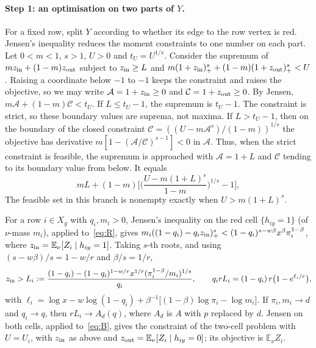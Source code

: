 \documentclass[11pt]{article}
\theoremstyle{definition}
\theoremstyle{remark}
\newcommand{\E}{\mathbb{E}}
\begin{document}
\paragraph{Step 1: an optimisation on two parts of $Y$.} For a fixed row, split $Y$ according to whether its
edge to the row vertex is red. Jensen's inequality reduces the moment constraints to one number on each part.
Let $0<m<1$, $s>1$, $U>0$ and $t_U=U^{1/s}$. Consider the supremum of
$mz_{\rm in}+(1-m)z_{\rm out}$ subject to $z_{\rm in}\ge L$ and $m(1+z_{\rm in})_+^s+(1-m)(1+z_{\rm out})_+^s<U$. Raising
a coordinate below $-1$ to $-1$ keeps the constraint and raises the objective, so we may write
$\mathcal A=1+z_{\rm in}\ge0$ and $\mathcal C=1+z_{\rm out}\ge0$. By Jensen, $m\mathcal A+(1-m)\mathcal C<t_U$. If
$L\le t_U-1$, the supremum is $t_U-1$. The constraint is strict, so these boundary values are suprema, not maxima.
If $L>t_U-1$, then on the boundary of the closed constraint
$\mathcal C=((U-m\mathcal A^s)/(1-m))^{1/s}$ the objective has derivative $m[1-(\mathcal A/\mathcal C)^{s-1}]<0$ in
$\mathcal A$. Thus, when the strict constraint is feasible, the supremum is approached with $\mathcal A=1+L$
and $\mathcal C$ tending to its boundary value from below. It equals
\begin{equation}\label{eq:twocell}
mL+(1-m)\Big[\Big(\frac{U-m(1+L)^s}{1-m}\Big)^{1/s}-1\Big],
\end{equation}
The feasible set in this branch is nonempty exactly when $U>m(1+L)^s$.

For a row $i\in X_g$ with $q_i,m_i>0$, Jensen's inequality on the red cell $\{h_{iy}=1\}$ (of $\nu$-mass $m_i$),
applied to~\eqref{eq:R}, gives $m_i((1-q_i)-q_iz_{\rm in})_+^s<(1-q_i)^{s-w\beta}x^\beta\pi_i^{1-\beta}$, where
$z_{\rm in}=\E_\nu[Z_i\mid h_{iy}=1]$. Taking $s$-th roots, and using $(s-w\beta)/s=1-w/r$ and $\beta/s=1/r$,
\begin{equation}\label{eq:L}
z_{\rm in}>L_i:=\frac{(1-q_i)-(1-q_i)^{1-w/r}x^{1/r}(\pi_i^{1-\beta}/m_i)^{1/s}}{q_i},\qquad
q_irL_i=(1-q_i)\,r\big(1-e^{\ell_i/r}\big),
\end{equation}
with $\ell_i=\log x-w\log(1-q_i)+\beta^{-1}\big[(1-\beta)\log\pi_i-\log m_i\big]$. If $\pi_i,m_i\to d$ and
$q_i\to q$, then $rL_i\to A_d(q)$, where $A_d$ is $A$ with $p$ replaced by $d$. Jensen on both cells, applied
to~\eqref{eq:B}, gives the constraint of the two-cell problem with $U=U_i$, with $z_{\rm in}$ as above and
$z_{\rm out}=\E_\nu[Z_i\mid h_{iy}=0]$; its objective is $\E_\nu Z_i$.
\end{document}
